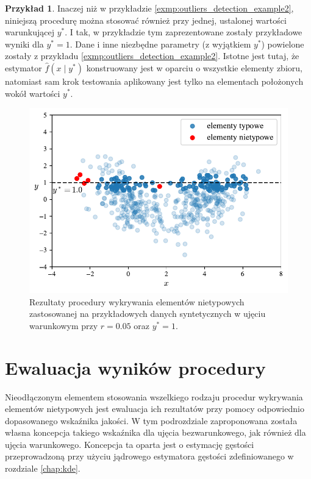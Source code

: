 \documentclass[12pt,a4paper,oneside]{book}
\theoremstyle{definition}
\newtheorem{exmp}{Przykład}[chapter]
\begin{document}
\begin{exmp}
Inaczej niż w przykładzie \ref{exmp:outliers_detection_example2}, niniejszą procedurę można stosować również przy jednej, ustalonej wartości warunkującej $y^*$. I tak, w przykładzie tym zaprezentowane zostały przykładowe wyniki dla $y^*=1$. Dane i inne niezbędne parametry (z wyjątkiem $y^*$) powielone zostały z przykładu \ref{exmp:outliers_detection_example2}. Istotne jest tutaj, że estymator $\hat{f}(x \mid y^*)$ konstruowany jest w oparciu o wszystkie elementy zbioru, natomiast sam krok testowania aplikowany jest tylko na elementach położonych wokół wartości $y^*$.
\begin{figure}[H]
    \centering
    \includegraphics[scale=0.69]{outliers_detection_example3}
    \vspace{-0.5cm} 
    \caption{Rezultaty procedury wykrywania elementów nietypowych zastosowanej na przykładowych danych syntetycznych w ujęciu warunkowym przy $r=0.05$ oraz $y^*=1$.}
    \label{fig:outliers_detection_example3}
\end{figure}
\end{exmp}

\section{Ewaluacja wyników procedury}

Nieodłączonym elementem stosowania wszelkiego rodzaju procedur wykrywania elementów nietypowych jest ewaluacja ich rezultatów przy pomocy odpowiednio dopasowanego wskaźnika jakości. W tym podrozdziale zaproponowana została własna koncepcja takiego wskaźnika dla ujęcia bezwarunkowego, jak również dla ujęcia warunkowego. Koncepcja ta oparta jest o estymację gęstości przeprowadzoną przy użyciu jądrowego estymatora gęstości zdefiniowanego w rozdziale \ref{chap:kde}.
\end{document}
